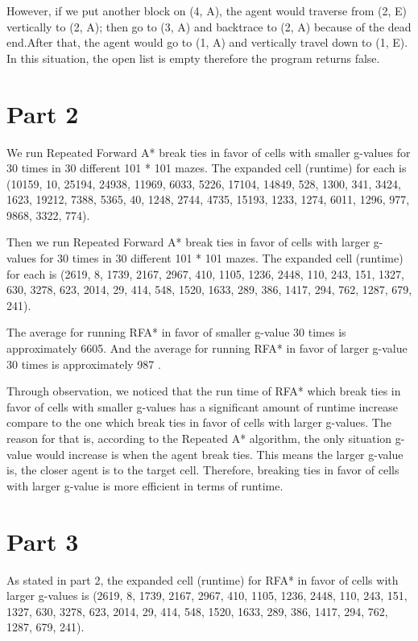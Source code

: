 \documentclass{article}
\begin{document}
However, if we put another block on (4, A), the agent would traverse from (2, E) vertically to (2, A); then go to (3, A) and backtrace to (2, A) because of the dead end.After that, the agent would go to (1, A) and vertically travel down to (1, E). In this situation, the open list is empty therefore the program returns false.

\section*{Part 2}
\hspace{5mm}
We run Repeated Forward A* break ties in favor of cells with smaller g-values for 30 times in 30 different 101 * 101 mazes. The expanded cell (runtime) for each is 
(10159, 10, 25194, 24938, 11969, 6033, 5226, 17104, 14849, 528, 1300, 341, 3424, 1623, 19212, 7388, 5365, 40, 1248, 2744, 4735, 15193, 1233, 1274, 6011, 1296, 977, 9868, 3322, 774).

Then we run Repeated Forward A* break ties in favor of cells with larger g-values for 30 times in 30 different 101 * 101 mazes. The expanded cell (runtime) for each is 
(2619, 8, 1739, 2167, 2967, 410, 1105, 1236, 2448, 110, 243, 151, 1327, 630, 3278, 623, 2014, 29, 414, 548, 1520, 1633, 289, 386, 1417, 294, 762, 1287, 679, 241).

The average for running RFA* in favor of smaller g-value 30 times is approximately 6605. And the average for running RFA* in favor of larger g-value 30 times is approximately 987 .

Through observation, we noticed that the run time of RFA* which break ties in favor of cells with smaller g-values has a significant amount of runtime increase compare to the one which break ties in favor of cells with larger g-values. The reason for that is, according to the Repeated A* algorithm, the only situation g-value would increase is when the agent break ties. This means the larger g-value is, the closer agent is to the target cell. Therefore, breaking ties in favor of cells with larger g-value is more efficient in terms of runtime.


\section*{Part 3}
\hspace{5mm}
As stated in part 2, the expanded cell (runtime) for RFA* in favor of cells with larger g-values is
(2619, 8, 1739, 2167, 2967, 410, 1105, 1236, 2448, 110, 243, 151, 1327, 630, 3278, 623, 2014, 29, 414, 548, 1520, 1633, 289, 386, 1417, 294, 762, 1287, 679, 241).
\end{document}
